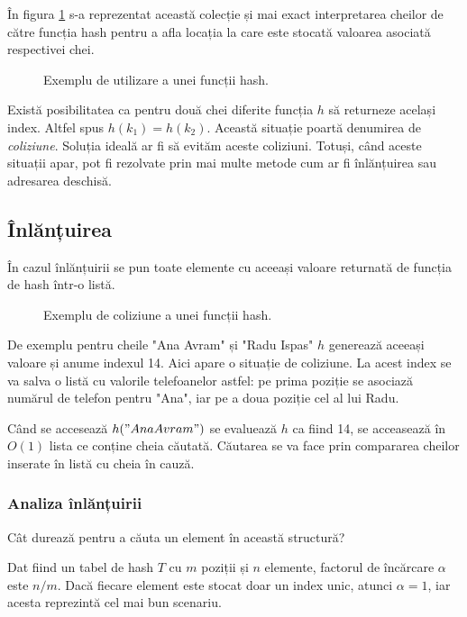 În figura \ref{fig:hashfunction} s-a reprezentat această colecție și mai exact interpretarea cheilor de către funcția hash pentru a afla locația la care este stocată valoarea asociată respectivei chei.

\begin{figure}[H] 
	\centering	
	{
	}
	\caption{Exemplu de utilizare a unei funcții hash.} 
	\label{fig:hashfunction}
\end{figure}

Există posibilitatea ca pentru două chei diferite funcția $h$ să returneze același index. Altfel spus $h(k_{1})=h(k_{2})$. Această situație poartă denumirea de \textit{coliziune}. Soluția ideală ar fi să evităm aceste coliziuni. Totuși, când aceste situații apar, pot fi rezolvate prin mai multe metode cum ar fi înlănțuirea sau adresarea deschisă.

\subsection{Înlănțuirea}

În cazul înlănțuirii se pun toate elemente cu aceeași valoare returnată de funcția de hash într-o listă. 

\begin{figure}[H] 
	\centering	
	{
	}
	\caption{Exemplu de coliziune a unei funcții hash.} 
	\label{fig:hashcolision}
\end{figure}

De exemplu pentru cheile "Ana Avram" și "Radu Ispas" $h$ generează aceeași valoare și anume indexul 14. Aici apare o situație de coliziune.
La acest index se va salva o listă cu valorile telefoanelor astfel: pe prima poziție se asociază numărul de telefon pentru "Ana", iar pe a doua poziție cel al lui Radu.

Când se accesează $h("Ana Avram")$ se evaluează $h$ ca fiind 14, se acceasează în $O(1)$ lista ce conține cheia căutată. Căutarea se va face prin compararea cheilor inserate în listă cu cheia în cauză. 

\subsubsection{Analiza înlănțuirii}

Cât durează pentru a căuta un element în această structură?

Dat fiind un tabel de hash $T$ cu $m$ poziții și $n$ elemente, factorul de încărcare $\alpha$ este $n/m$. Dacă fiecare element este stocat doar un index unic, atunci $\alpha=1$, iar acesta reprezintă cel mai bun scenariu.

